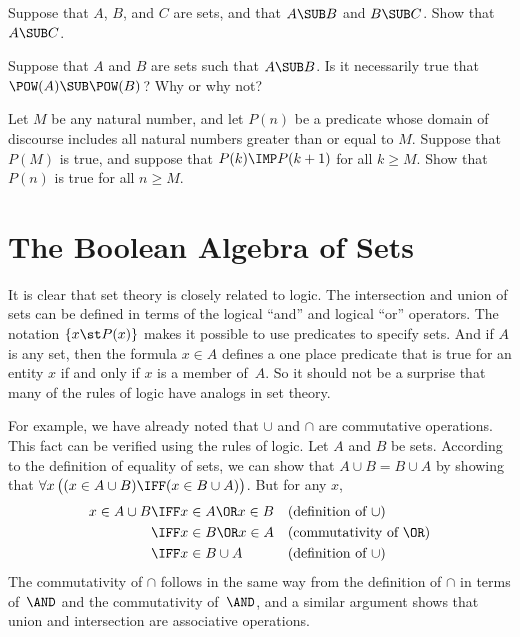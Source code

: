 \begin{exercises}
\problem\label{E-subtrans} Suppose that $A$, $B$, and $C$ are sets, and that
$A\SUB B$ and $B\SUB C$.  Show that $A\SUB C$.

\problem Suppose that $A$ and $B$ are sets such that $A\SUB B$.
Is it necessarily true that $\POW(A)\SUB \POW(B)\,$?
Why or why not?


\problem Let $M$ be any natural number, and let $P(n)$ be a
predicate whose domain of discourse includes all natural numbers
greater than or equal to $M$.  Suppose that $P(M)$ is true,
and suppose that $P(k)\IMP P(k+1)$ for all $k\ge M$.
Show that $P(n)$ is true for all $n\ge M$.


\end{exercises}




\section{The Boolean Algebra of Sets}\label{S-sets-2}

It is clear that set theory is closely related to logic.
The intersection and union
of sets can be defined in terms of the logical ``and''
and logical ``or'' operators.
The notation $\{x\st P(x)\}$ makes it possible to use predicates
to specify sets.  And if $A$ is any set, then the formula
$x\in A$ defines a one place predicate that is true for an entity $x$
if and only if $x$ is a member of~$A$.  So it should not be a
surprise that many of the rules of logic have analogs in
set theory.

For example, we have already noted that $\cup$ and $\cap$ are
commutative operations.   This fact can be verified using the
rules of logic.  Let $A$ and $B$ be sets.  According to the definition 
of equality of sets, we can show that $A\cup B=B\cup A$ by showing
that $\forall x\,\big((x\in A\cup B)\IFF(x\in B\cup A)\big)$.
But for any $x$,
\begin{align*}
x\in A\cup B &\IFF x\in A \OR x\in B  &&\text{(definition of $\cup$)}\\
             &\IFF x\in B \OR x\in A  &&\text{(commutativity of $\OR$)}\\
             &\IFF x\in B \cup A      &&\text{(definition of $\cup$)}
\end{align*}
The commutativity of $\cap$ follows in the same way from the
definition of $\cap$ in terms of~$\AND$ and the commutativity of~$\AND$,
and a similar argument shows that union and intersection are
associative operations.

